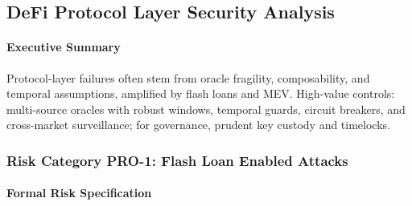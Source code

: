 \subsection{DeFi Protocol Layer Security Analysis}
\label{sec:results_defi_protocol}

\paragraph{Executive Summary}
Protocol-layer failures often stem from oracle fragility, composability, and temporal assumptions, amplified by flash loans and MEV. High-value controls: multi-source oracles with robust windows, temporal guards, circuit breakers, and cross-market surveillance; for governance, prudent key custody and timelocks.

\subsubsection{Risk Category PRO-1: Flash Loan Enabled Attacks}

\paragraph{Formal Risk Specification}

